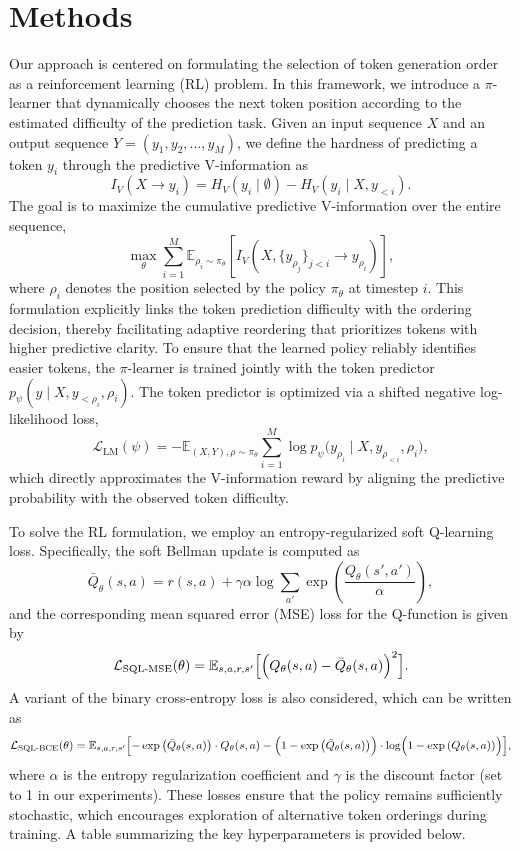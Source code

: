 \documentclass{article} %
\begin{document}
\section{Methods}
Our approach is centered on formulating the selection of token generation order as a reinforcement learning (RL) problem. In this framework, we introduce a $\pi$-learner that dynamically chooses the next token position according to the estimated difficulty of the prediction task. Given an input sequence \( X \) and an output sequence \( Y = (y_1, y_2, \dots, y_M) \), we define the hardness of predicting a token \( y_i \) through the predictive V-information as
\[
I_V(X \to y_i) = H_V(y_i \mid \emptyset) - H_V(y_i \mid X, y_{<i}).
\]
The goal is to maximize the cumulative predictive V-information over the entire sequence,
\[
\max_{\theta} \sum_{i=1}^{M} \mathbb{E}_{\rho_i \sim \pi_\theta}\left[ I_V\left(X, \{y_{\rho_j}\}_{j<i} \to y_{\rho_i}\right) \right],
\]
where \(\rho_i\) denotes the position selected by the policy \(\pi_\theta\) at timestep \(i\). This formulation explicitly links the token prediction difficulty with the ordering decision, thereby facilitating adaptive reordering that prioritizes tokens with higher predictive clarity. To ensure that the learned policy reliably identifies easier tokens, the $\pi$-learner is trained jointly with the token predictor \(p_\psi(y \mid X, y_{<\rho_i}, \rho_i)\). The token predictor is optimized via a shifted negative log-likelihood loss,
\[
\mathcal{L}_{\text{LM}}(\psi) = -\mathbb{E}_{(X,Y), \rho \sim \pi_\theta} \sum_{i=1}^{M} \log p_\psi\big(y_{\rho_i} \mid X, y_{\rho_{<i}}, \rho_i\big),
\]
which directly approximates the V-information reward by aligning the predictive probability with the observed token difficulty.

To solve the RL formulation, we employ an entropy-regularized soft Q-learning loss. Specifically, the soft Bellman update is computed as
\[
\bar{Q}_\theta(s, a) = r(s, a) + \gamma \alpha \log \sum_{a'} \exp\left(\frac{Q_\theta(s',a')}{\alpha}\right),
\]
and the corresponding mean squared error (MSE) loss for the Q-function is given by
\[
\mathcal{L}_{\text{SQL-MSE}}(\theta) = \mathbb{E}_{s,a,r,s'} \Bigl[\Bigl(Q_\theta(s,a) - \bar{Q}_\theta(s,a)\Bigr)^2\Bigr].
\]
A variant of the binary cross-entropy loss is also considered, which can be written as
\[
\mathcal{L}_{\text{SQL-BCE}}(\theta) = \mathbb{E}_{s,a,r,s'} \Bigl[-\exp\left(\bar{Q}_\theta(s,a)\right) \cdot Q_\theta(s,a) - \Bigl(1 - \exp\left(\bar{Q}_\theta(s,a)\right)\Bigr) \cdot \log\Bigl(1 - \exp\left(Q_\theta(s,a)\right)\Bigr)\Bigr],
\]
where \( \alpha \) is the entropy regularization coefficient and \( \gamma \) is the discount factor (set to 1 in our experiments). These losses ensure that the policy remains sufficiently stochastic, which encourages exploration of alternative token orderings during training. A table summarizing the key hyperparameters is provided below.
\end{document}
